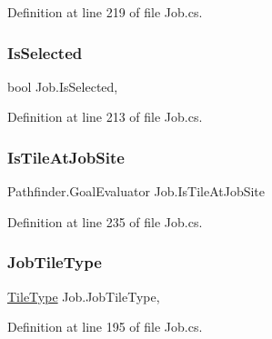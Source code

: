 Definition at line 219 of file Job.\+cs.

\mbox{\label{class_job_ac490b750b4dbe8227081665d882f900a}} 
\subsubsection{\texorpdfstring{Is\+Selected}{IsSelected}}
{\footnotesize\ttfamily bool Job.\+Is\+Selected\hspace{0.3cm}{\ttfamily [get]}, {\ttfamily [set]}}



Definition at line 213 of file Job.\+cs.

\mbox{\label{class_job_a6975b7688a7fd6e7cd74544446ecbe4f}} 
\subsubsection{\texorpdfstring{Is\+Tile\+At\+Job\+Site}{IsTileAtJobSite}}
{\footnotesize\ttfamily Pathfinder.\+Goal\+Evaluator Job.\+Is\+Tile\+At\+Job\+Site\hspace{0.3cm}{\ttfamily [get]}}



Definition at line 235 of file Job.\+cs.

\mbox{\label{class_job_ad894f38bb82ebf71a83f803f72bbf54e}} 
\subsubsection{\texorpdfstring{Job\+Tile\+Type}{JobTileType}}
{\footnotesize\ttfamily \hyperlink{class_tile_type}{Tile\+Type} Job.\+Job\+Tile\+Type\hspace{0.3cm}{\ttfamily [get]}, {}}



Definition at line 195 of file Job.\+cs.

\mbox{\label{class_job_a0d4591bf90e5ca18e52abab59235f945}} 

